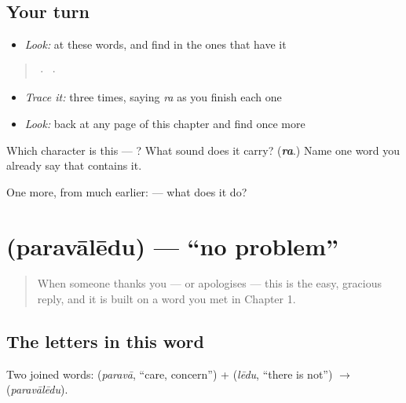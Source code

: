 \subsection*{Your turn}
\begin{itemize}
\raggedright
  \item \emph{Look:} at these words, and find  in the ones that have it
\end{itemize}

\begin{quote}
  ·    ·  
\end{quote}

\begin{itemize}
\raggedright
  \item \emph{Trace it:}  three times, saying \emph{ra} as you finish each one
  \item \emph{Look:} back at any page of this chapter and find  once more
\end{itemize}

\begin{tcolorbox}[breakable,colback=teal!4,colframe=teal!35!black,title={Before you move on}]
Which character is this — ? What sound does it carry? (\emph{\textbf{ra}}.) Name one word you already say that contains it.

One more, from much earlier:  — what does it do?
\end{tcolorbox}
\section[\texorpdfstring{\te{పరవాలేదు} (paravālēdu)}{పరవాలేదు (paravālēdu)}]{ (paravālēdu) — \textquotedblleft{}no problem\textquotedblright{}}

\label{lesson:TE-C03-paravaaledu}



\begin{quote}
When someone thanks you — or apologises — this is the easy, gracious reply, and it is built on a word you met in Chapter 1.
\end{quote}

\subsection*{The letters in this word}
Two joined words: \textbf{} (\emph{paravā}, \textquotedblleft{}care, concern\textquotedblright{}) + \textbf{} (\emph{lēdu}, \textquotedblleft{}there is not\textquotedblright{}) $\to$ \textbf{} (\emph{paravālēdu}).

